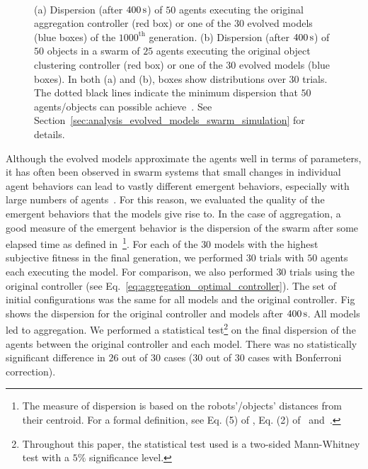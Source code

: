 \begin{figure}[!t]
	\centering
		\\
		\caption{(a) Dispersion (after $\unit[400]{s}$) of $50$ agents executing the original aggregation controller (red box) or one of the $30$ evolved models (blue boxes) of the $1000^\mathrm{th}$ generation. (b) Dispersion (after $\unit[400]{s}$) of $50$ objects in a swarm of $25$ agents executing the original object clustering controller (red box) or one of the $30$ evolved models (blue boxes). In both (a) and (b), boxes show distributions over $30$ trials. The dotted black lines indicate the minimum dispersion that $50$ agents/objects can possible achieve~\cite{Graham1990}. See Section~\ref{sec:analysis_evolved_models_swarm_simulation} for details.\label{fig:model_validation_simulation}}
\end{figure}

Although the evolved models approximate the agents well in terms of parameters, it has often been observed in swarm systems that small changes in individual agent behaviors can lead to vastly different emergent behaviors, especially with large numbers of agents~\cite{Paul2010}. For this reason, we evaluated the quality of the emergent behaviors that the models give rise to. In the case of aggregation, a good measure of the emergent behavior is the dispersion of the swarm after some elapsed time as defined in~\cite{Gauci2014_ijrr}\footnote{The measure of dispersion is based on the robots'/objects' distances from their centroid. For a formal definition, see Eq. (5) of \cite{Gauci2014_ijrr}, Eq. (2) of~\cite{Melvin2014_aamas} and~\cite{Graham1990}.}. For each of the $30$ models with the highest subjective fitness in the final generation, we performed $30$ trials with $50$ agents each executing the model. For comparison, we also performed $30$ trials using the original controller (see Eq.~\eqref{eq:aggregation_optimal_controller}). The set of initial configurations was the same for all models and the original controller. Fig~ shows the dispersion for the original controller and models after $\unit[400]{s}$. All models led to aggregation. We performed a statistical test\footnote{Throughout this paper, the statistical test used is a two-sided Mann-Whitney test with a $5\%$ significance level.} on the final dispersion of the agents between the original controller and each model. There was no statistically significant difference in $26$ out of $30$ cases ($30$ out of $30$ cases with Bonferroni correction). 


